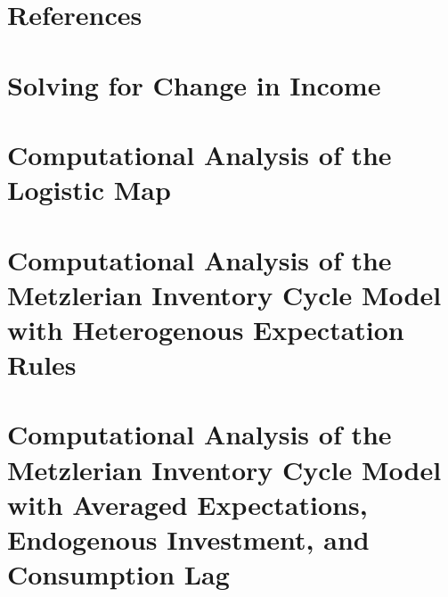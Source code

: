 \documentclass[12pt,twoside]{report}
\begin{document}
\chapter{References}

\begin{appendices}
\chapter{Solving for Change in Income}\label{appendix_growth}

\chapter{Computational Analysis of the Logistic Map}

\chapter{Computational Analysis of the Metzlerian Inventory Cycle Model with Heterogenous Expectation Rules}

\chapter{Computational Analysis of the Metzlerian Inventory Cycle Model with Averaged Expectations, Endogenous Investment, and Consumption Lag}
	
\end{appendices}
\end{document}
